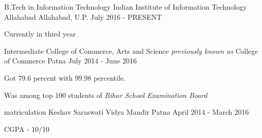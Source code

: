 \begin{cventries}
  \cventry
    {B.Tech in Information Technology}
    {Indian Institute of Information Technology Allahabad}
    {Allahabad, U.P.}
    {July 2016 - PRESENT}
    {
      \begin{cvitems}
        \item {Currently in third year}
      \end{cvitems}
    }
\end{cventries}
\begin{cventries}
  \cventry
      { Intermediate }
     { College of Commerce, Arts and Science \textit{previously known as} College of Commerce}{
Patna}
    {July 2014 - June 2016}
    {
      \begin{cvitems}
        \item {Got 79.6 percent with 99.98 percentile.}
      \end{cvitems}
      \vspace{6mm} %
      \begin{cvitems}
        \item {Was among top 100 students of \textit{Bihar School Examination Board}}
      \end{cvitems}
    }
\end{cventries}
\begin{cventries}
  \cventry
    {matriculation}
    {Keshav Saraswati Vidya Mandir}
    {Patna}
    {April 2014 - March 2016}
    {
      \begin{cvitems}
        \item {CGPA - 10/10}
      \end{cvitems}
    }
\end{cventries}
